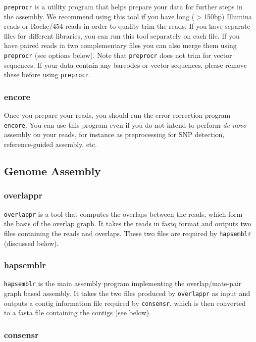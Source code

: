 \documentclass[12pt,a4paper]{report}
\begin{document}
\texttt{preprocr} is a utility program that helps prepare your data for further steps in the assembly. We recommend using this tool if you have long ($>$150bp) Illumina reads or Roche/454 reads in order to quality trim the reads. If you have separate files for different libraries, you can run this tool separately on each file. If you have paired reads in two complementary files you can also merge them using \texttt{preprocr} (see options below). Note that \texttt{preprocr} does not trim for vector sequences. If your data contain any barcodes or vector sequences, please remove these before using \texttt{preprocr}.

\subsubsection{encore}
\label{ercor}

Once you prepare your reads, you should run the error correction program \texttt{encore}. You can use this program even if you do not intend to perform \emph{de novo} assembly on your reads, for instance as preprocessing for SNP detection, reference-guided assembly, etc.

\subsection{Genome Assembly}

\subsubsection{overlappr}

\texttt{overlappr} is a tool that computes the overlaps between the reads, which form the basis of the overlap
graph. It takes the reads in fastq format and outputs two files containing the reads and overlaps. These two files are
required by \texttt{hapsemblr} (discussed below).

\subsubsection{hapsemblr}

\texttt{hapsemblr} is the main assembly program implementing the overlap/mate-pair graph based assembly.
It takes the two files produced by \texttt{overlappr} as input and outputs a contig information file required
by \texttt{consensr}, which is then converted to a fasta file containing the contigs (see below).

\subsubsection{consensr}
\label{cons}
\end{document}
